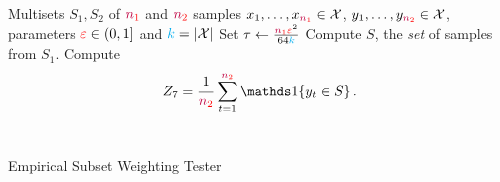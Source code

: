 \begin{algorithm}[ht!]
  \begin{algorithmic}[1]
    \Require Multisets $S_1, S_2$ of $\textcolor{red}{{\textcolor{purple}{n}}_1}$ and $\textcolor{red}{{\textcolor{purple}{n}}_2}$ samples $x_1,\dots,x_{\textcolor{red}{{\textcolor{purple}{n}}_1}}\in \mathcal{X}$, $y_1,\dots,y_{\textcolor{red}{{\textcolor{purple}{n}}_2}}\in \mathcal{X}$, parameters $\textcolor{red}{\varepsilon}\in(0,1]$ and $\ab = \abs{\domain}$
    \State Set $\tau \gets \frac{\textcolor{red}{{\textcolor{purple}{n}}_1}\textcolor{red}{\varepsilon}^2}{64{\textcolor{cyan}{k}}}$
    \State Compute $S$, the \emph{set} of samples from $S_1$. 
    \State Compute 
    \[
        Z_7 = \frac{1}{\nst} \sum_{t=1}^{\nst} \indic{y_t\in S}\,.
    \]
     \Return \reject {}
    \Else\ 
      \Return \accept {}
    \EndIf
  \end{algorithmic}
  \caption{\label{algo:empirical:subset}\sc Empirical Subset Weighting Tester}
\end{algorithm}

